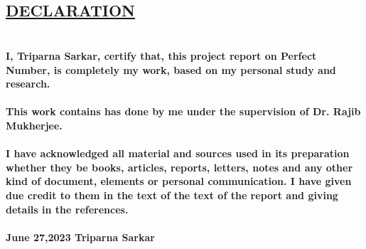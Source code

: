 \documentclass[12pt,,a4paper]{book}
\begin{document}
\clearpage


\begin{center}
    
\section*{\color{blue}\underline {DECLARATION}}
\end{center}
\thispagestyle{empty}
\section*{}

\paragraph{
I, Triparna Sarkar, certify that, this project report on \textbf{Perfect Number}, is completely my work, based on my personal study and research.
}
\paragraph{
This work contains has done by me under the supervision of Dr. Rajib Mukherjee.
} 

\paragraph{
I have acknowledged all material and sources used in its preparation whether they be books, articles, reports, letters, notes and any other kind of document, elements or personal communication. I have given due credit to them in the text of the text of the report and giving details in the references. 
} 



\paragraph{
    June 27,2023 \hspace{7cm} Triparna Sarkar
}
\vspace{1.5cm}



\newpage



\end{document}
